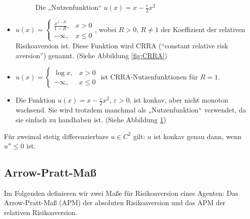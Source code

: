 \documentclass[a4paper,twoside,DIV15,BCOR12mm]{scrbook}
\begin{document}
\begin{beispiel}
\begin{itemize}
\begin{figure}
\begin{center}
\end{center}
\caption{Die „Nutzenfunktion“ $u(x) = x - \frac\varepsilon2x^2$}
\label{fig:Parabel}
\end{figure}

\item $u(x) = 
\begin{cases}
\frac{x^{1-R}}{1-R}, & x > 0 \\
-\infty, & x \le 0
\end{cases}$, wobei $R>0$, $R\ne 1$ der Koeffizient der relativen Risikoaversion ist. Diese Funktion wird CRRA (“constant relative risk aversion”) genannt. (Siehe Abbildung \ref{fig:CRRA})
\item $u(x) = 
\begin{cases}
\log x, & x > 0 \\
-\infty, & x \le 0
\end{cases}$ ist CRRA-Nutzenfunktionen für $R=1$.
\item Die Funktion $u(x) = x - \frac\varepsilon2x^2$, $\varepsilon>0$, ist konkav, aber nicht monoton wachsend. Sie wird trotzdem manchmal als „Nutzenfunktion“ verwendet, da sie einfach zu handhaben ist. (Siehe Abbildung \ref{fig:Parabel})
\end{itemize}
\end{beispiel}

\begin{bemerkung}
Für zweimal stetig differenzierbare $u\in C^2$ gilt: $u$ ist konkav genau dann, wenn $u''\le 0$ ist.
\end{bemerkung}

\subsection{Arrow-Pratt-Maß}

Im Folgenden definieren wir zwei Maße für Risikoaversion eines Agenten: Das Arrow-Pratt-Maß (APM) der absoluten Risikoaversion und das APM der relativen Risikoaversion.
\end{document}
